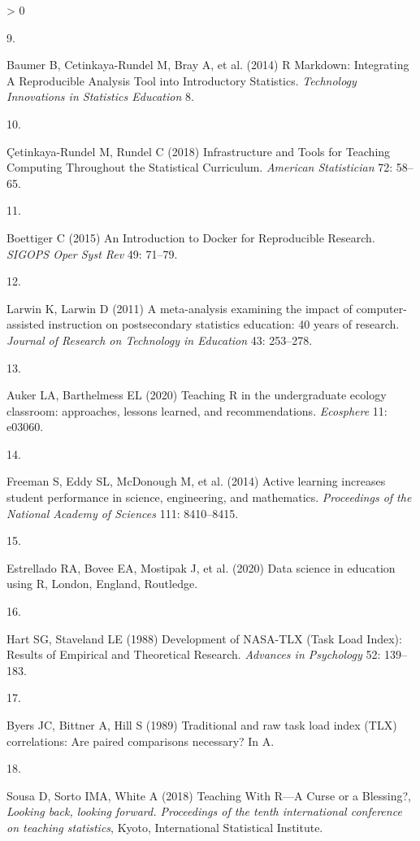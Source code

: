 \documentclass[
]{article}
\newlength{\cslhangindent}
\newlength{\csllabelwidth}
\newenvironment{CSLReferences}[2] %
 {%
  \setlength{\parindent}{0pt}
  \ifodd #1 \everypar{\setlength{\hangindent}{\cslhangindent}}\ignorespaces\fi
  \ifnum #2 > 0
  \setlength{\parskip}{#2\baselineskip}
  \fi
 }%
 {}
\newcommand{\CSLLeftMargin}[1]{\parbox[t]{\csllabelwidth}{#1}}
\newcommand{\CSLRightInline}[1]{\parbox[t]{\linewidth - \csllabelwidth}{#1}\break}
\begin{document}
\begin{CSLReferences}{0}{0}
\leavevmode\hypertarget{ref-Baumer2014}{}%
\CSLLeftMargin{9. }
\CSLRightInline{Baumer B, Cetinkaya-Rundel M, Bray A, et al. (2014) {R
Markdown: Integrating A Reproducible Analysis Tool into Introductory
Statistics}. \emph{Technology Innovations in Statistics Education} 8.}

\leavevmode\hypertarget{ref-Cetinkaya-Rundel2018}{}%
\CSLLeftMargin{10. }
\CSLRightInline{Çetinkaya-Rundel M, Rundel C (2018) {Infrastructure and
Tools for Teaching Computing Throughout the Statistical Curriculum}.
\emph{American Statistician} 72: 58--65.}

\leavevmode\hypertarget{ref-Boettiger2015}{}%
\CSLLeftMargin{11. }
\CSLRightInline{Boettiger C (2015) {An Introduction to Docker for
Reproducible Research}. \emph{SIGOPS Oper Syst Rev} 49: 71--79.}

\leavevmode\hypertarget{ref-Larwin2011}{}%
\CSLLeftMargin{12. }
\CSLRightInline{Larwin K, Larwin D (2011) {A meta-analysis examining the
impact of computer-assisted instruction on postsecondary statistics
education: 40 years of research}. \emph{Journal of Research on
Technology in Education} 43: 253--278.}

\leavevmode\hypertarget{ref-Auker2020}{}%
\CSLLeftMargin{13. }
\CSLRightInline{Auker LA, Barthelmess EL (2020) {Teaching R in the
undergraduate ecology classroom: approaches, lessons learned, and
recommendations}. \emph{Ecosphere} 11: e03060.}

\leavevmode\hypertarget{ref-Freeman2014}{}%
\CSLLeftMargin{14. }
\CSLRightInline{Freeman S, Eddy SL, McDonough M, et al. (2014) {Active
learning increases student performance in science, engineering, and
mathematics}. \emph{Proceedings of the National Academy of Sciences}
111: 8410--8415.}

\leavevmode\hypertarget{ref-Estrellado2020}{}%
\CSLLeftMargin{15. }
\CSLRightInline{Estrellado RA, Bovee EA, Mostipak J, et al. (2020) {Data
science in education using R}, London, England, Routledge.}

\leavevmode\hypertarget{ref-Hart1988}{}%
\CSLLeftMargin{16. }
\CSLRightInline{Hart SG, Staveland LE (1988) {Development of NASA-TLX
(Task Load Index): Results of Empirical and Theoretical Research}.
\emph{Advances in Psychology} 52: 139--183.}

\leavevmode\hypertarget{ref-Byers1989}{}%
\CSLLeftMargin{17. }
\CSLRightInline{Byers JC, Bittner A, Hill S (1989) {Traditional and raw
task load index (TLX) correlations: Are paired comparisons necessary? In
A}.}

\leavevmode\hypertarget{ref-Sousa2018}{}%
\CSLLeftMargin{18. }
\CSLRightInline{Sousa D, Sorto IMA, White A (2018) {Teaching With R---A
Curse or a Blessing?}, \emph{Looking back, looking forward. Proceedings
of the tenth international conference on teaching statistics}, Kyoto,
International Statistical Institute.}

\end{CSLReferences}
\end{document}
